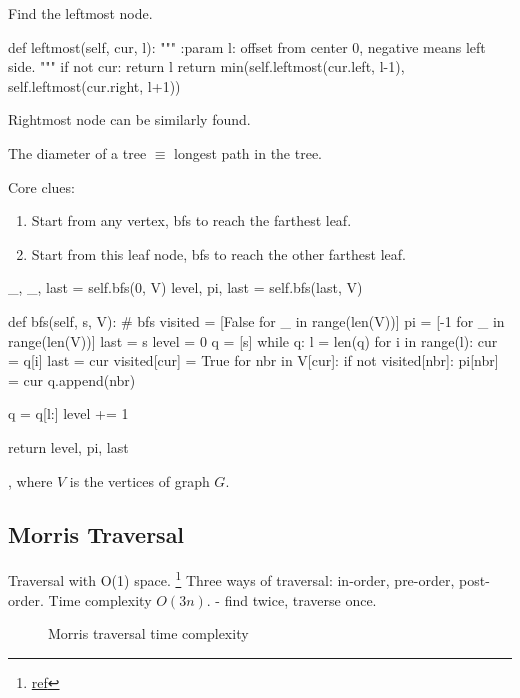  Find the leftmost node. 
\begin{python}
def leftmost(self, cur, l):
    """
    :param l: offset from center 0, negative means left side. 
    """
    if not cur: return l
    return min(self.leftmost(cur.left, l-1), 
               self.leftmost(cur.right, l+1))
\end{python}

Rightmost node can be similarly found.

 The diameter of a tree $\equiv$ longest path in the tree.

Core clues:
\begin{enumerate}
\item Start from any vertex, bfs to reach the farthest leaf.
\item Start from this leaf node, bfs to reach the other farthest leaf. 
\end{enumerate}
\begin{python}
_, _, last = self.bfs(0, V)
level, pi, last = self.bfs(last, V)

def bfs(self, s, V):
    # bfs
    visited = [False for _ in range(len(V))]
    pi = [-1 for _ in range(len(V))]
    last = s
    level = 0
    q = [s]
    while q:
        l = len(q)
        for i in range(l):
            cur = q[i]
            last = cur
            visited[cur] = True
            for nbr in V[cur]:
                if not visited[nbr]:
                    pi[nbr] = cur
                    q.append(nbr)

        q = q[l:]
        level += 1

    return level, pi, last
\end{python}

, where $V$ is the vertices of graph $G$.


\newpage
\subsection{Morris Traversal} 
Traversal with O(1) space. \footnote{\href{http://www.cnblogs.com/AnnieKim/archive/2013/06/15/MorrisTraversal.html}{ref}}
Three ways of traversal: in-order, pre-order, post-order.
Time complexity $O(3n).$ - find  twice,  traverse once.
\begin{figure}[hbtp]
\centering
{}
\caption{Morris traversal time complexity}
\label{fig:morrisTime}
\end{figure}

